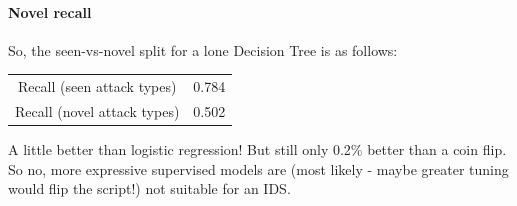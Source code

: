 \documentclass{article}
\begin{document}
\paragraph{Novel recall} So, the seen-vs-novel split for a lone Decision Tree is as follows:
\begin{center}
\begin{tabular}{ |c | c| } 
 \hline
 Recall (seen attack types) & 0.784  \\
 Recall (novel attack types) & 0.502  \\ 
 \hline
\end{tabular}
\end{center}
A little better than logistic regression! But still only 0.2\% better than a coin flip. So no, more expressive supervised models are (most likely - maybe greater tuning would flip the script!) not suitable for an IDS.
\end{document}
